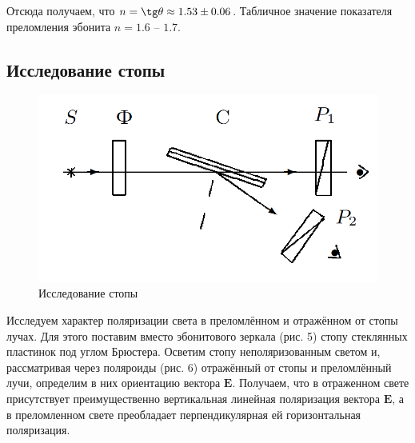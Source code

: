 \documentclass[a4paper,12pt]{article}
\begin{document}
Отсюда получаем, что $ n = \tg \theta \approx 1.53 \pm 0.06 $. Табличное значение показателя преломления эбонита $ n = 1.6 $ -- $ 1.7 $.

\subsection{Исследование стопы}
\begin{figure}
	\includegraphics[width=\linewidth]{6}
	\caption{Исследование стопы}
	\label{ris 6}
\end{figure}
Исследуем характер поляризации света в преломлённом и отражённом от стопы лучах. 
Для этого поставим вместо эбонитового зеркала (рис. 5) стопу стеклянных пластинок под углом Брюстера.
Осветим стопу неполяризованным светом и, рассматривая через поляроиды (рис. 6) отражённый от стопы и преломлённый лучи, определим в них ориентацию вектора $ \mathbf{E} $. Получаем, что в отраженном свете присутствует преимущественно вертикальная линейная поляризация вектора $ \mathbf{E} $, а в преломленном свете преобладает перпендикулярная ей горизонтальная поляризация.
\end{document}
